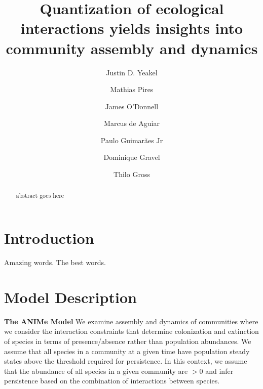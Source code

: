 \documentclass[twocolumn,preprintnumbers,amsmath,amssymb,superscriptaddress]{revtex4-1}
\begin{document}
\author{Justin D. Yeakel} 

\author{Mathias Pires} \affiliation{}

\author{James O'Donnell} \affiliation{}

\author{Marcus de Aguiar} \affiliation{}

\author{Paulo Guimar\~aes Jr} \affiliation{}

\author{Dominique Gravel} \affiliation{}

\author{Thilo Gross} \affiliation{}

\title{Quantization of ecological interactions yields insights into community assembly and dynamics}


\begin{abstract}
abstract goes here
\end{abstract}

\maketitle

\section*{Introduction}

Amazing words. The best words.



\section*{Model Description}

{\bf The ANIMe Model} 
We examine assembly and dynamics of communities where we consider the interaction constraints that determine colonization and extinction of species in terms of presence/absence rather than population abundances.
We assume that all species in a community at a given time have population steady states above the threshold required for persistence.
In this context, we assume that the abundance of all species in a given community are $>0$ and infer persistence based on the combination of interactions between species.
\end{document}
